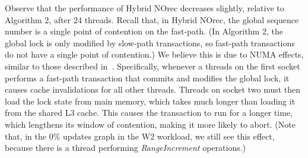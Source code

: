 Observe that the performance of Hybrid NOrec decreases slightly, relative to Algorithm 2, after 24 threads.
Recall that, in Hybrid NOrec, the global sequence number is a single point of contention on the fast-path.
(In Algorithm 2, the global lock is only modified by slow-path transactions, so fast-path transactions do not have a single point of contention.)
We believe this is due to NUMA effects, similar to those described in~\cite{BKLL16}.
Specifically, whenever a threads on the first socket performs a fast-path transaction that commits and modifies the global lock, it causes cache invalidations for all other threads.
Threads on socket two must then load the lock state from main memory, which takes much longer than loading it from the shared L3 cache.
This causes the transaction to run for a longer time, which lengthens its window of contention, making it more likely to abort.
(Note that, in the 0\% updates graph in the W2 workload, we still see this effect, because there is a thread performing \textit{RangeIncrement} operations.)

